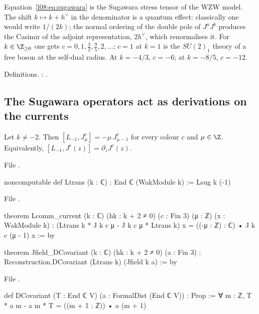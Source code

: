 \begin{physics}
Equation~\eqref{l08:eq:sugawara} is the Sugawara stress tensor of the WZW model. The shift
$k\mapsto k+h^\vee$ in the denominator is a quantum effect: classically one would write $1/(2k)$; the
normal ordering of the double pole of $J^aJ^b$ produces the Casimir of the adjoint representation,
$2h^\vee$, which renormalises it. For $k\in\Z_{\ge0}$ one gets $c = 0, 1, \frac32, \frac95, 2,\ldots$;
$c=1$ at $k=1$ is the $SU(2)_1$ theory of a free boson at the self-dual radius. At $k=-4/3$, $c=-6$; at
$k=-8/5$, $c=-12$.
\end{physics}

\begin{status}
Definitions. : \lean{[propext, Classical.}\allowbreak{}\allowbreak\lean{sound]}.
\end{status}

\subsection{The Sugawara operators act as derivations on the currents}

\begin{theorem}\label{l08:thm:Lcomm}
Let $k\ne-2$. Then $[L_{-1},J^c_\mu] = -\mu\,J^c_{\mu-1}$ for every colour $c$ and $\mu\in\Z$. Equivalently,
$[L_{-1},J^c(z)] = \partial_zJ^c(z)$.
\end{theorem}

\noindent File .
\begin{leancode}
noncomputable def Ltrans (k : ℂ) : End ℂ (WakModule k) := Lsug k (-1)
\end{leancode}
\noindent File .
\begin{leancode}
theorem Lcomm_current (k : ℂ) (hk : k + 2 ≠ 0) (c : Fin 3) (μ : ℤ) (x : WakModule k) :
    (Ltrans k * J k c μ - J k c μ * Ltrans k) x = ((-μ : ℤ) : ℂ) • J k c (μ - 1) x := by

theorem Jfield_DCovariant (k : ℂ) (hk : k + 2 ≠ 0) (a : Fin 3) :
    Reconstruction.DCovariant (Ltrans k) (Jfield k a) := by
\end{leancode}
\noindent File .
\begin{leancode}
def DCovariant (T : End ℂ V) (a : FormalDist (End ℂ V)) : Prop :=
  ∀ m : ℤ, T * a m - a m * T = ((m + 1 : ℤ)) • a (m + 1)
\end{leancode}


